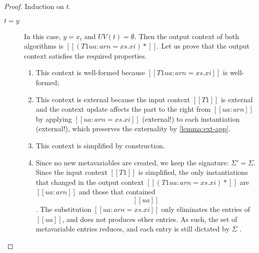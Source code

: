 \documentclass[a4,natbib=false]{article}
\begin{document}
\begin{proof}
  Induction on $t$.
  \begin{description}
  \item[$t = y$] In this case, $y = x_i$ and $UV(t) = \emptyset$.
    Then the output context of both algorithms is $[[(T1{ua:arn=xs.xi})*]]$.
    Let us prove that the output context satisfies the required properties.
    \begin{enumerate}
      \item This context is well-formed because $[[T1{ua:arn=xs.xi}]]$ is well-formed;
      \item This context is external because the input context $[[T1]]$ is
        external and the context update affects the part to the right from
        $[[ua:arn]]$ by applying $[[ua:arn=xs.xi]]$ (external!) to each
        instantiation (external!), which preserves the externality by
        \cref{lemma:ext-app}.
      \item This context is simplified by construction.
      \item Since no new metavariables are created, we keep the signature:
        $\Sigma' = \Sigma$. Since the input context $[[T1]]$ is simplified,
        the only instantiations that changed in the output context
        $[[(T1{ua:arn=xs.xi})*]]$ are $[[ua:arn]]$
        and those that contained $$[[ua]]$$. The substitution  
        $[[ua:arn=xs.xi]]$ only eliminates the entries of $[[ua]]$,
        and does not produces other entries. As such, the set of metavariable
        entries reduces, and each entry is still dictated by $\Sigma$ .
    \end{enumerate}


\end{description}
\end{proof}
\end{document}
